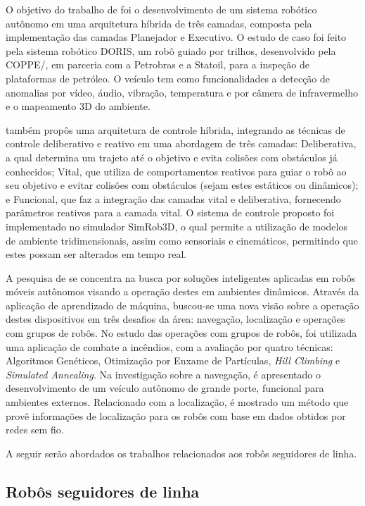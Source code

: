 O objetivo do trabalho de  foi o desenvolvimento de um sistema robótico autônomo em uma 
arquitetura híbrida de três camadas, composta pela implementação das camadas Planejador e Executivo. 
O estudo de caso foi feito pela sistema robótico DORIS, um robô 
guiado por trilhos, desenvolvido pela COPPE/, 
em parceria com a Petrobras e a Statoil, para a inspeção de plataformas de petróleo. O veículo 
tem como funcionalidades a detecção de anomalias por vídeo, áudio, vibração, temperatura e por câmera de infravermelho e o 
mapeamento 3D do ambiente.


 também propôs uma arquitetura de controle híbrida, integrando as técnicas de controle deliberativo e 
reativo em uma abordagem de três camadas: Deliberativa, a qual determina um trajeto até o objetivo e evita colisões com obstáculos 
já conhecidos; Vital, que utiliza de comportamentos reativos para guiar o robô ao seu objetivo e evitar colisões com obstáculos 
(sejam estes estáticos ou dinâmicos); e Funcional, que faz a integração das camadas vital e deliberativa, fornecendo parâmetros 
reativos para a camada vital. O sistema de controle proposto foi implementado no simulador SimRob3D, o qual permite a utilização de 
modelos de ambiente 
tridimensionais, assim como sensoriais e cinemáticos, permitindo que estes possam ser alterados em tempo real.


A pesquisa de  se concentra na busca por soluções inteligentes aplicadas em robôs móveis autônomos visando a operação 
destes em ambientes dinâmicos. Através da aplicação de aprendizado de máquina, buscou-se uma nova visão sobre a operação destes 
dispositivos em três desafios da área: navegação, localização e operações com grupos de robôs. 
No estudo das operações com grupos de robôs, foi utilizada uma aplicação de combate a 
incêndios, com a avaliação por quatro técnicas: Algoritmos Genéticos, 
Otimização por Enxame de Partículas, \textit{Hill Climbing} e \textit{Simulated Annealing}. Na investigação sobre a navegação, é 
apresentado o desenvolvimento de um veículo autônomo de grande porte, funcional para ambientes externos. Relacionado com a localização, 
é mostrado um método que provê informações de localização para os robôs com base em dados obtidos por redes sem fio.\par

A seguir serão abordados os trabalhos relacionados aos robôs seguidores de linha.

\subsection{Robôs seguidores de linha}

